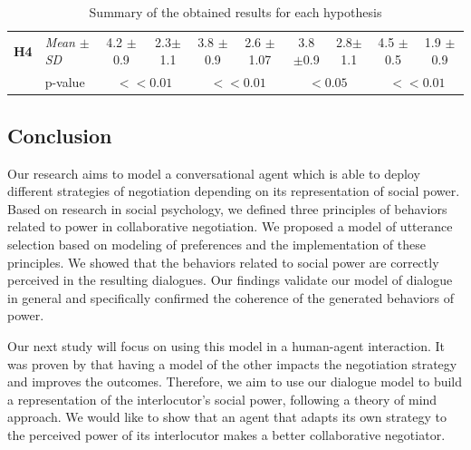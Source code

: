 \documentclass{llncs}
\begin{document}
\begin{table}[t]
{\begin{tabular}{|ll|c|c|c|c|c|c|c|c|}
						
						\newline \multirow{2}{*} {\textbf{H4}} & \multicolumn{1}{|l|}{ \textit{Mean} $\pm$ \textit{SD} } & 4.2 $\pm$ 0.9 & 2.3$\pm$ 1.1  & 3.8 $\pm$0.9 & 2.6 $\pm$1.07 & 3.8 $\pm$0.9  & 2.8$\pm$ 1.1  & 4.5 $\pm$0.5  & 1.9 $\pm$ 0.9\\
						\cline{2-10}
						\newline & \multicolumn{1}{|l|}{p-value} & \multicolumn{2}{c|}{ $<<0.01$} & \multicolumn{2}{c|}{ $<<0.01$} & \multicolumn{2}{c|}{ $<0.05$}& \multicolumn{2}{c|}{ $<<0.01$}\\
						\hline	
					\end{tabular}
				}
				\caption{Summary of the obtained results for each hypothesis}
				\label{res}
			\end{table}
			
			\subsection{Conclusion}
			
			Our research aims to model a conversational agent which is able to deploy different strategies of negotiation depending on its representation of social power. Based on research in social psychology, we defined three principles of behaviors related to power in collaborative negotiation. We proposed a model of utterance selection based on modeling of preferences and the implementation of these principles. We showed that the behaviors related to social power are correctly perceived in the resulting dialogues. Our findings validate our model of dialogue in general and specifically confirmed the coherence of the generated behaviors of power.
			
			Our next study will focus on using this model in a human-agent interaction. It was proven by \cite{klatt2011negotiations} that having a model of the other impacts the negotiation strategy and improves the outcomes. Therefore, we aim to use our dialogue model to build a representation of the interlocutor's social power, following a theory of mind approach. We would like to show that an agent that adapts its own strategy to the perceived power of its interlocutor makes a better collaborative negotiator.		
			
			
			
			\scriptsize{	
				
				}
			
			
			
		
\end{document}
